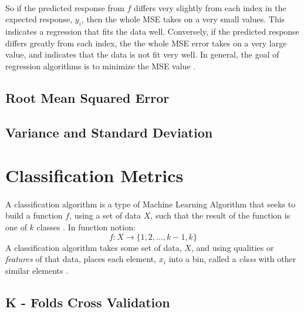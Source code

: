 \documentclass[12pt,letterpaper]{article}
\begin{document}
\paragraph*{}So if the predicted response from $\hat{f}$ differs very slightly from each index in the expected response, $y_i$, then the whole MSE takes on a very small values. This indicates a regression that fits the data well. Conversely, if the predicted response differs greatly from each index, the the whole MSE error takes on a very large value, and indicates that the data is not fit very well. In general, the goal of regression algorithms is to minimize the MSE value \cite{Petrik}.


\subsection{Root Mean Squared Error}



\subsection{Variance and Standard Deviation}


\section{Classification Metrics}
\paragraph*{}A classification algorithm is a type of Machine Learning Algorithm that seeks to build a function $f$, using a set of data $X$, such that the result of the function is one of $k$ classes \cite{Petrik}. In function notion:
\begin{equation}
\label{classification function}
f: X \rightarrow \{1,2,...,k-1,k\}
\end{equation}
A classification algorithm takes some set of data, $X$, and using qualities or \textit{features} of that data, places each element, $x_i$ into a bin, called a \textit{class} with other similar elements \cite{Geron}. 


\subsection{K - Folds Cross Validation}
\end{document}
